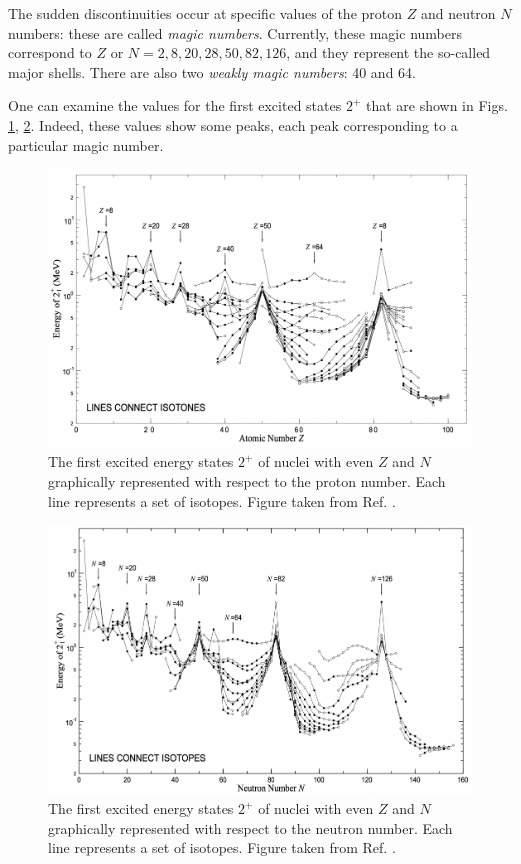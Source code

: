 The sudden discontinuities occur at specific values of the proton $Z$ and neutron $N$ numbers: these are called \emph{magic numbers}. Currently, these magic numbers correspond to $Z$ or $N=2,8,20,28,50,82,126$, and they represent the so-called major shells. There are also two \emph{weakly magic numbers}: 40 and 64.

One can examine the values for the first excited states $2^+$ that are shown in Figs. \ref{e2plus_proton}, \ref{e2plus_neutron}. Indeed, these values show some peaks, each peak corresponding to a particular magic number.

\begin{figure}
    \centering
    \includegraphics[scale=0.33]{Chapters/Figures/E2plus_proton.pdf}
    \caption{The first excited energy states $2^+$ of nuclei with even $Z$ and $N$ graphically represented with respect to the proton number. Each line represents a set of isotopes. Figure taken from Ref. \cite{matta2017exotic}.}
    \label{e2plus_proton}
\end{figure}

\begin{figure}
    \centering
    \includegraphics[scale=0.33]{Chapters/Figures/E2plus_neutron.pdf}
    \caption{The first excited energy states $2^+$ of nuclei with even $Z$ and $N$ graphically represented with respect to the neutron number. Each line represents a set of isotopes. Figure taken from Ref. \cite{matta2017exotic}.}
    \label{e2plus_neutron}
\end{figure}

